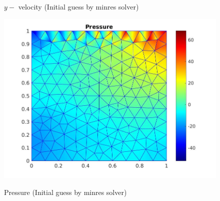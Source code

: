\documentclass[a4paper]{book}
\begin{document}
\begin{figure}
\begin{minipage}[c]{0.3\textwidth}
    \caption{$y-$ velocity (Initial guess by minres solver)}
  \label{y_vel_navier_stoke_minres_lid}
  \end{minipage}
  \begin{minipage}[c]{0.67\textwidth}
    \includegraphics[width=\textwidth]{lid_newton_pressure_minres.jpg}
  \end{minipage}\hfill
  \begin{minipage}[c]{0.3\textwidth}
    \caption{Pressure (Initial guess by minres solver)}
  \label{pressure_navier_stoke_minres_lid}
  \end{minipage}
\caption{\label{lid_driven_cavity_n_s_minres}}
\end{figure}
\end{document}
